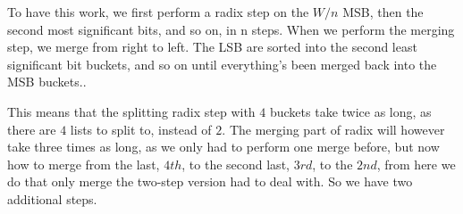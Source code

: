 \documentclass[a4paper,10pt,titlepage]{article}
\begin{document}
To have this work, we first perform a radix step on the $W/n$ MSB, then the second most significant bits, and so on, in n steps. When we perform the merging step, we merge from right to left. The LSB are sorted into the second least significant bit buckets, and so on until everything's been merged back into the MSB buckets..

This means that the splitting radix step with $4$ buckets take twice as long, as there are $4$ lists to split to, instead of $2$. The merging part of radix will however take three times as long, as we only had to perform one merge before, but now how to merge from the last, $4th$, to the second last, $3rd$, to the $2nd$, from here we do that only merge the two-step version had to deal with. So we have two additional steps.
\end{document}
